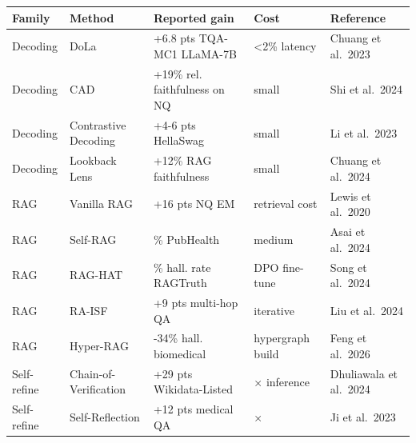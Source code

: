 {\def\LTcaptype{none} %
\begin{longtable}[]{@{}
  >{\raggedright\arraybackslash}p{}
  >{\raggedright\arraybackslash}p{}
  >{\raggedright\arraybackslash}p{}
  >{\raggedright\arraybackslash}p{}
  >{\raggedright\arraybackslash}p{}@{}}
\toprule\noalign{}
\begin{minipage}[b]{\linewidth}\raggedright
Family
\end{minipage} & \begin{minipage}[b]{\linewidth}\raggedright
Method
\end{minipage} & \begin{minipage}[b]{\linewidth}\raggedright
Reported gain
\end{minipage} & \begin{minipage}[b]{\linewidth}\raggedright
Cost
\end{minipage} & \begin{minipage}[b]{\linewidth}\raggedright
Reference
\end{minipage} \\
\midrule\noalign{}
\endhead
\bottomrule\noalign{}
\endlastfoot
Decoding & DoLa & +6.8 pts TQA-MC1 LLaMA-7B & \textless2\% latency & Chuang et al.~2023 \\
Decoding & CAD & +19\% rel. faithfulness on NQ & small & Shi et al.~2024 \\
Decoding & Contrastive Decoding & +4-6 pts HellaSwag & small & Li et al.~2023 \\
Decoding & Lookback Lens & +12\% RAG faithfulness & small & Chuang et al.~2024 \\
RAG & Vanilla RAG & +16 pts NQ EM & retrieval cost & Lewis et al.~2020 \\
RAG & Self-RAG & 73.5\% PubHealth & medium & Asai et al.~2024 \\
RAG & RAG-HAT & -53\% hall. rate RAGTruth & DPO fine-tune & Song et al.~2024 \\
RAG & RA-ISF & +9 pts multi-hop QA & iterative & Liu et al.~2024 \\
RAG & Hyper-RAG & -21-34\% hall. biomedical & hypergraph build & Feng et al.~2026 \\
Self-refine & Chain-of-Verification & +29 pts Wikidata-Listed & 3× inference & Dhuliawala et al.~2024 \\
Self-refine & Self-Reflection & +12 pts medical QA & 2× & Ji et al.~2023 \\

\end{longtable}}
